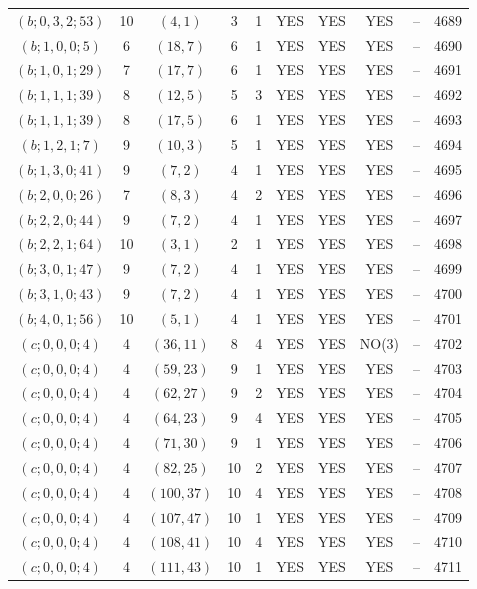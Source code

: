 \begin{longtable}{|c|c|c|c|c|c|c|c|c|c|}
$(b; 0, 3, 2; 53)$ & 10 & $(4, 1)$ & 3 & 1 & YES & YES & YES & -- & 4689\\
$(b; 1, 0, 0; 5)$ & 6 & $(18, 7)$ & 6 & 1 & YES & YES & YES & -- & 4690\\
$(b; 1, 0, 1; 29)$ & 7 & $(17, 7)$ & 6 & 1 & YES & YES & YES & -- & 4691\\
$(b; 1, 1, 1; 39)$ & 8 & $(12, 5)$ & 5 & 3 & YES & YES & YES & -- & 4692\\
$(b; 1, 1, 1; 39)$ & 8 & $(17, 5)$ & 6 & 1 & YES & YES & YES & -- & 4693\\
$(b; 1, 2, 1; 7)$ & 9 & $(10, 3)$ & 5 & 1 & YES & YES & YES & -- & 4694\\
$(b; 1, 3, 0; 41)$ & 9 & $(7, 2)$ & 4 & 1 & YES & YES & YES & -- & 4695\\
$(b; 2, 0, 0; 26)$ & 7 & $(8, 3)$ & 4 & 2 & YES & YES & YES & -- & 4696\\
$(b; 2, 2, 0; 44)$ & 9 & $(7, 2)$ & 4 & 1 & YES & YES & YES & -- & 4697\\
$(b; 2, 2, 1; 64)$ & 10 & $(3, 1)$ & 2 & 1 & YES & YES & YES & -- & 4698\\
$(b; 3, 0, 1; 47)$ & 9 & $(7, 2)$ & 4 & 1 & YES & YES & YES & -- & 4699\\
$(b; 3, 1, 0; 43)$ & 9 & $(7, 2)$ & 4 & 1 & YES & YES & YES & -- & 4700\\
$(b; 4, 0, 1; 56)$ & 10 & $(5, 1)$ & 4 & 1 & YES & YES & YES & -- & 4701\\
$(c; 0, 0, 0; 4)$ & 4 & $(36, 11)$ & 8 & 4 & YES & YES & NO(3) & -- & 4702\\
$(c; 0, 0, 0; 4)$ & 4 & $(59, 23)$ & 9 & 1 & YES & YES & YES & -- & 4703\\
$(c; 0, 0, 0; 4)$ & 4 & $(62, 27)$ & 9 & 2 & YES & YES & YES & -- & 4704\\
$(c; 0, 0, 0; 4)$ & 4 & $(64, 23)$ & 9 & 4 & YES & YES & YES & -- & 4705\\
$(c; 0, 0, 0; 4)$ & 4 & $(71, 30)$ & 9 & 1 & YES & YES & YES & -- & 4706\\
$(c; 0, 0, 0; 4)$ & 4 & $(82, 25)$ & 10 & 2 & YES & YES & YES & -- & 4707\\
$(c; 0, 0, 0; 4)$ & 4 & $(100, 37)$ & 10 & 4 & YES & YES & YES & -- & 4708\\
$(c; 0, 0, 0; 4)$ & 4 & $(107, 47)$ & 10 & 1 & YES & YES & YES & -- & 4709\\
$(c; 0, 0, 0; 4)$ & 4 & $(108, 41)$ & 10 & 4 & YES & YES & YES & -- & 4710\\
$(c; 0, 0, 0; 4)$ & 4 & $(111, 43)$ & 10 & 1 & YES & YES & YES & -- & 4711\\

\end{longtable}
